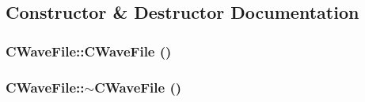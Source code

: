 \subsection{Constructor \& Destructor Documentation}
\hypertarget{class_c_wave_file_a4b7eb059e75249788ca628533fea295f}{
\subsubsection[{CWaveFile}]{\setlength{\rightskip}{0pt plus 5cm}CWaveFile::CWaveFile ()}}
\label{class_c_wave_file_a4b7eb059e75249788ca628533fea295f}
\hypertarget{class_c_wave_file_aea59e99b66ec0c314cfcc239df26ca05}{
\subsubsection[{$\sim$CWaveFile}]{\setlength{\rightskip}{0pt plus 5cm}CWaveFile::$\sim$CWaveFile ()}}
\label{class_c_wave_file_aea59e99b66ec0c314cfcc239df26ca05}


